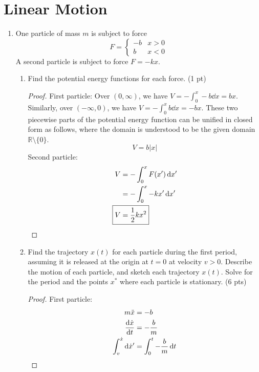 \documentclass[../psets.tex]{subfiles}
\begin{document}
\section{Linear Motion}
\begin{enumerate}
    \item {}One particle of mass $m$ is subject to force
    \begin{equation*}
        F =
        \begin{cases}
            -b & x>0\\
            b & x<0
        \end{cases}
    \end{equation*}
    A second particle is subject to force $F=-kx$.
    \begin{enumerate}
        \item Find the potential energy functions for each force. (1 pt)
        \begin{proof}
            First particle: Over $(0,\infty)$, we have $V=-\int_0^x-b\dd{x}=bx$. Similarly, over $(-\infty,0)$, we have $V=-\int_0^xb\dd{x}=-bx$. These two piecewise parts of the potential energy function can be unified in closed form as follows, where the domain is understood to be the given domain $\mathbb{R}\setminus\{0\}$.
            \begin{equation*}
                \boxed{V = b|x|}
            \end{equation*}
            Second particle:
            \begin{align*}
                V &= -\int_0^xF(x')\dd{x'}\\
                &= -\int_0^x-kx'\dd{x'}\\
                \Aboxed{V &= \frac{1}{2}kx^2}
            \end{align*}
        \end{proof}
        \item Find the trajectory $x(t)$ for each particle during the first period, assuming it is released at the origin at $t=0$ at velocity $v>0$. Describe the motion of each particle, and sketch each trajectory $x(t)$. Solve for the period and the points $x^*$ where each particle is stationary. (6 pts)
        \begin{proof}
            First particle:
            \begin{align*}
                m\ddot{x} &= -b\\
                \dv{\dot{x}}{t} &= -\frac{b}{m}\\
                \int_v^{\dot{x}}\dd{\dot{x}'} &= \int_0^t-\frac{b}{m}\dd{t}\\

\end{align*}
\end{proof}
\end{enumerate}
\end{enumerate}
\end{document}
